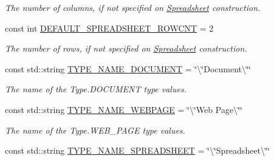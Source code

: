 \begin{DoxyCompactItemize}
\begin{DoxyCompactList}\small\item\em The number of columns, if not specified on \hyperlink{classdocs_1_1Spreadsheet}{Spreadsheet} construction. \end{DoxyCompactList}\item 
\hypertarget{namespacedocs_a7562daac15433871b1cc71ad74555032}{const int \hyperlink{namespacedocs_a7562daac15433871b1cc71ad74555032}{D\-E\-F\-A\-U\-L\-T\-\_\-\-S\-P\-R\-E\-A\-D\-S\-H\-E\-E\-T\-\_\-\-R\-O\-W\-C\-N\-T} = 2}\label{namespacedocs_a7562daac15433871b1cc71ad74555032}

\begin{DoxyCompactList}\small\item\em The number of rows, if not specified on \hyperlink{classdocs_1_1Spreadsheet}{Spreadsheet} construction. \end{DoxyCompactList}\item 
\hypertarget{namespacedocs_a88f8e41b03147cf4197261676999d12c}{const std\-::string \hyperlink{namespacedocs_a88f8e41b03147cf4197261676999d12c}{T\-Y\-P\-E\-\_\-\-N\-A\-M\-E\-\_\-\-D\-O\-C\-U\-M\-E\-N\-T} = \char`\"{}\textbackslash{}\char`\"{}Document\textbackslash{}\char`\"{}\char`\"{}}\label{namespacedocs_a88f8e41b03147cf4197261676999d12c}

\begin{DoxyCompactList}\small\item\em The name of the Type.\-D\-O\-C\-U\-M\-E\-N\-T type values. \end{DoxyCompactList}\item 
\hypertarget{namespacedocs_ac41cf3635e22c3750deddd000fd4c34b}{const std\-::string \hyperlink{namespacedocs_ac41cf3635e22c3750deddd000fd4c34b}{T\-Y\-P\-E\-\_\-\-N\-A\-M\-E\-\_\-\-W\-E\-B\-P\-A\-G\-E} = \char`\"{}\textbackslash{}\char`\"{}Web Page\textbackslash{}\char`\"{}\char`\"{}}\label{namespacedocs_ac41cf3635e22c3750deddd000fd4c34b}

\begin{DoxyCompactList}\small\item\em The name of the Type.\-W\-E\-B\-\_\-\-P\-A\-G\-E type values. \end{DoxyCompactList}\item 
\hypertarget{namespacedocs_a3f58481f03c01b3da04828585d14ff77}{const std\-::string \hyperlink{namespacedocs_a3f58481f03c01b3da04828585d14ff77}{T\-Y\-P\-E\-\_\-\-N\-A\-M\-E\-\_\-\-S\-P\-R\-E\-A\-D\-S\-H\-E\-E\-T} = \char`\"{}\textbackslash{}\char`\"{}Spreadsheet\textbackslash{}\char`\"{}\char`\"{}}\label{namespacedocs_a3f58481f03c01b3da04828585d14ff77}


\end{DoxyCompactItemize}
